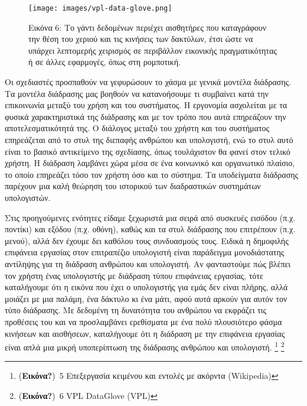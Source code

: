 \documentclass[
]{article}
\begin{document}
\leavevmode{}%
\begin{figure}
\hypertarget{fig:vpl-data-glove}{%
\centering
\texttt{[image: images/vpl-data-glove.png]}
\caption{Εικόνα 6: Το γάντι δεδομένων περιέχει αισθητήρες που
καταγράφουν την θέση του χεριού και τις κινήσεις των δακτύλων, έτσι ώστε
να υπάρχει λεπτομερής χειρισμός σε περιβάλλον εικονικής πραγματικότητας
ή σε άλλες εφαρμογές, όπως στη ρομποτική.}\label{fig:vpl-data-glove}
}
\end{figure}

Οι σχεδιαστές προσπαθούν να γεφυρώσουν το χάσμα με γενικά μοντέλα
διάδρασης. Τα μοντέλα διάδρασης μας βοηθούν να κατανοήσουμε τι συμβαίνει
κατά την επικοινωνία μεταξύ του χρήση και του συστήματος. Η εργονομία
ασχολείται με τα φυσικά χαρακτηριστικά της διάδρασης και με τον τρόπο
που αυτά επηρεάζουν την αποτελεσματικότητά της. Ο διάλογος μεταξύ του
χρήστη και του συστήματος επηρεάζεται από το στυλ της διεπαφής ανθρώπου
και υπολογιστή, ενώ το στυλ αυτό είναι το βασικό αντικείμενο της
σχεδίασης, όπως τουλάχιστον θα φανεί στον τελικό χρήστη. Η διάδραση
λαμβάνει χώρα μέσα σε ένα κοινωνικό και οργανωτικό πλαίσιο, το οποίο
επηρεάζει τόσο τον χρήστη όσο και το σύστημα. Τα υποδείγματα διάδρασης
παρέχουν μια καλή θεώρηση του ιστορικού των διαδραστικών συστημάτων
υπολογιστών.

Στις προηγούμενες ενότητες είδαμε ξεχωριστά μια σειρά από συσκευές
εισόδου (π.χ. ποντίκι) και εξόδου (π.χ. οθόνη), καθώς και τα στυλ
διάδρασης που επιτρέπουν (π.χ. μενού), αλλά δεν έχουμε δει καθόλου τους
συνδυασμούς τους. Ειδικά η δημοφιλής επιφάνεια εργασίας στον επιτραπέζιο
υπολογιστή είναι παράδειγμα μονοδιάστατης αντίληψης για τη διάδραση
ανθρώπου και υπολογιστή. Αν φανταστούμε πώς βλέπει τον χρήστη ένας
υπολογιστής με διάδραση τύπου επιφάνειας εργασίας, τότε καταλήγουμε ότι
η εικόνα που έχει ο υπολογιστής για εμάς δεν είναι πλήρης, αλλά μοιάζει
με μια παλάμη, ένα δάκτυλο κι ένα μάτι, αφού αυτά αρκούν για αυτόν τον
τύπο διάδρασης. Με δεδομένη τη δυνατότητα του ανθρώπου να εκφράζει τις
προθέσεις του και να προσλαμβάνει ερεθίσματα με ένα πολύ πλουσιότερο
φάσμα κινήσεων και αισθήσεων, καταλήγουμε ότι η διάδραση με την
επιφάνεια εργασίας είναι απλά μια μικρή υποπερίπτωση της διάδρασης
ανθρώπου και υπολογιστή. \footnote{(\textbf{Εικόνα?})~5 Επεξεργασία
  κειμένου και εντολές με ακόρντα (Wikipedia)} \footnote{(\textbf{Εικόνα?})~6
  VPL DataGlove (VPL)}
\end{document}
